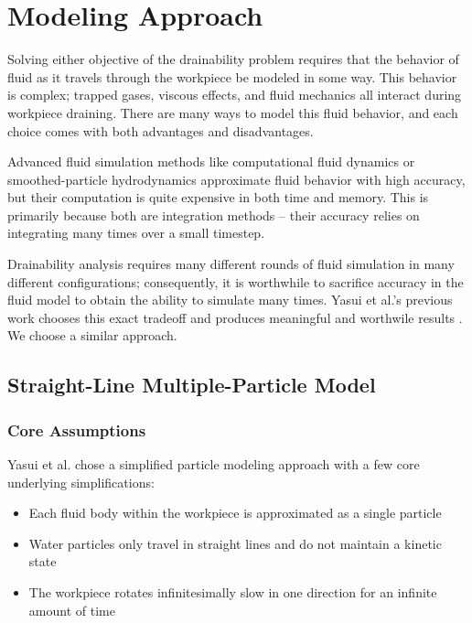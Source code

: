 						\chapter{Modeling Approach}

Solving either objective of the drainability problem requires that the behavior of fluid as it travels through the workpiece be modeled in some way. This behavior is complex; trapped gases, viscous effects, and fluid mechanics all interact during workpiece draining. There are many ways to model this fluid behavior, and each choice comes with both advantages and disadvantages.

Advanced fluid simulation methods like computational fluid dynamics or smoothed-particle hydrodynamics approximate fluid behavior with high accuracy, but their computation is quite expensive in both time and memory. This is primarily because both are integration methods -- their accuracy relies on integrating many times over a small timestep.

Drainability analysis requires many different rounds of fluid simulation in many different configurations; consequently, it is worthwhile to sacrifice accuracy in the fluid model to obtain the ability to simulate many times. Yasui et al.'s previous work chooses this exact tradeoff and produces meaningful and worthwile results \cite{Yasui2011}. We choose a similar approach.

\section{Straight-Line Multiple-Particle Model}

	\subsection{Core Assumptions}

Yasui et al. \cite{Yasui2011} chose a simplified particle modeling approach with a few core underlying simplifications:

\begin{itemize}
	\item Each fluid body within the workpiece is approximated as a single particle
	\item Water particles only travel in straight lines and do not maintain a kinetic state
	\item The workpiece rotates infinitesimally slow in one direction for an infinite amount of time
\end{itemize}


